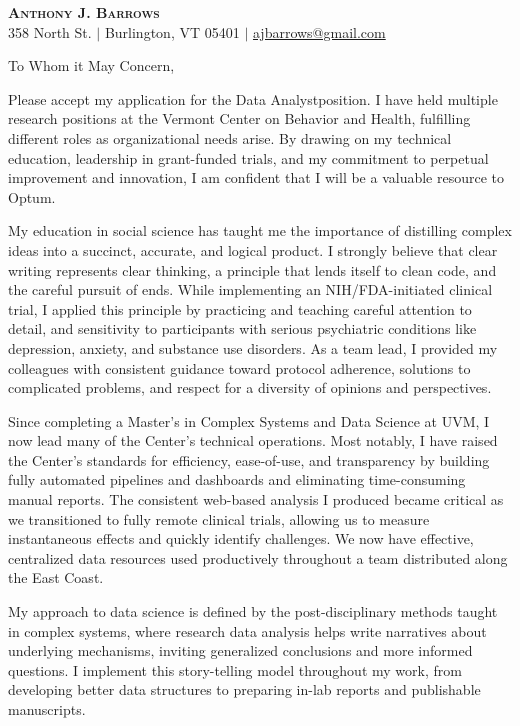 \documentclass[letterpaper,11pt]{article}
\newcommand{\company}{Optum}
\newcommand{\position}{Data Analyst}
\begin{document}
\begin{center}
    \textbf{\Huge \scshape Anthony J. Barrows} \\ \vspace{3pt}
    \small 358 North St. $|$
    \small Burlington, VT 05401 $|$
    \href{mailto:ajbarrows@gmail.com}{ajbarrows@gmail.com}
\end{center}
\vspace{5mm}
	
	To Whom it May Concern,
	\vspace{3mm}
	
	Please accept my application for the \position \space position. I have held multiple research positions at the Vermont Center on Behavior and Health, fulfilling different roles as organizational needs arise. By drawing on my technical education, leadership in grant-funded trials, and my commitment to perpetual improvement and innovation, I am confident that I will be a valuable resource to \company.
	
	
	My education in social science has taught me the importance of distilling complex ideas into a succinct, accurate, and logical product. I strongly believe that clear writing represents clear thinking, a principle that lends itself to clean code, and the careful pursuit of ends. While implementing an NIH/FDA-initiated clinical trial, I applied this principle by practicing and teaching careful attention to detail, and sensitivity to participants with serious psychiatric conditions like depression, anxiety, and substance use disorders. As a team lead, I provided my colleagues with consistent guidance toward protocol adherence, solutions to complicated problems, and respect for a diversity of opinions and perspectives.
	
	
	Since completing a Master's in Complex Systems and Data Science at UVM, I now lead many of the Center's technical operations. Most notably, I have raised the Center’s standards for efficiency, ease-of-use, and transparency by building fully automated pipelines and dashboards and eliminating time-consuming manual reports. The consistent web-based analysis I produced became critical as we transitioned to fully remote clinical trials, allowing us to measure instantaneous effects and quickly identify challenges. We now have effective, centralized data resources used productively throughout a team distributed along the East Coast. 
	
	My approach to data science is defined by the post-disciplinary methods taught in complex systems, where research data analysis helps write narratives about underlying mechanisms, inviting generalized conclusions and more informed questions. I implement this story-telling model throughout my work, from developing better data structures to preparing in-lab reports and publishable manuscripts.
	
\end{document}

